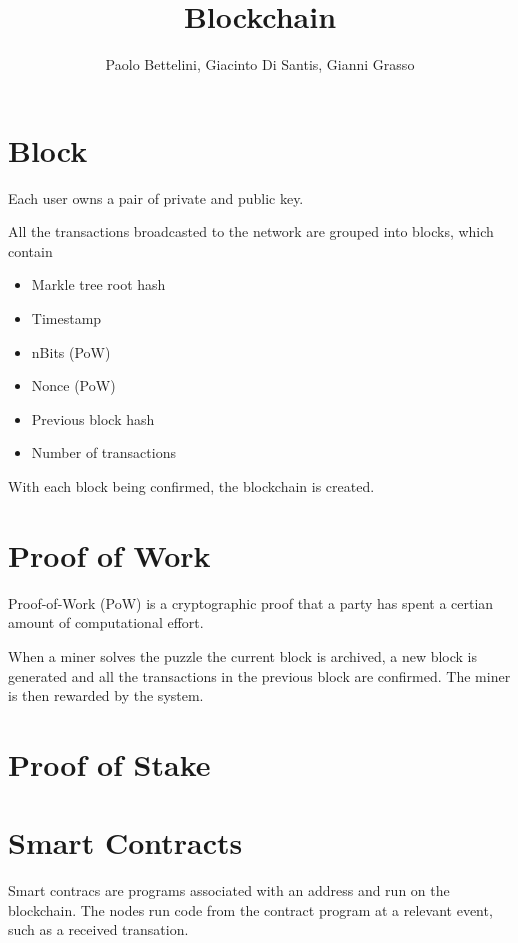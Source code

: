 \documentclass{article}
\title{Blockchain}
\author{Paolo Bettelini, Giacinto Di Santis, Gianni Grasso}
\date{}
\begin{document}
\maketitle
\tableofcontents
\pagebreak

\section{Block}

Each user owns a pair of private and public key.

All the transactions broadcasted to the network are grouped into blocks, which contain

\begin{itemize}
    \item Markle tree root hash
    \item Timestamp
    \item nBits (PoW)
    \item Nonce (PoW)
    \item Previous block hash
    \item Number of transactions
\end{itemize}

With each block being confirmed, the blockchain is created.

\section{Proof of Work}

Proof-of-Work (PoW) is a cryptographic proof that a party has spent
a certian amount of computational effort.

When a miner solves the puzzle the current block is archived, a new
block is generated and all the transactions in the previous block are confirmed.
The miner is then rewarded by the system.

\section{Proof of Stake}

\pagebreak

\section{Smart Contracts}

Smart contracs are programs associated with an address and run on the blockchain.
The nodes run code from the contract program at a relevant event, such as a received transation.
\end{document}
